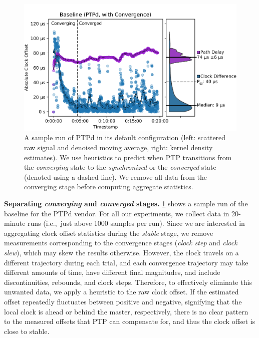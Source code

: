 \begin{figure}
    \includegraphics[width=\linewidth]{res/generated/base/rpi08-convergence_2.pdf}
    \caption{A sample run of PTPd in its default configuration (left: scattered
    raw signal and denoised moving average, right: kernel density estimates).
    We use heuristics to predict when PTP transitions from the
    \textit{converging} state to the \textit{synchronized} or the
    \textit{converged} state (denoted using a dashed line).
    We remove all data from the converging stage before computing aggregate
    statistics.}
    \label{fig:baseline_sample}
\end{figure}

\textbf{Separating \textit{converging} and \textit{converged} stages.}
\cref{fig:baseline_sample} shows a sample run of the baseline for the
PTPd vendor.
For all our experiments, we collect data in 20-minute runs
(i.e.,~just above 1000 samples per run).
Since we are interested in aggregating clock offset statistics during the
\textit{stable} stage,
we remove measurements corresponding to the convergence stages
(\textit{clock step} and \textit{clock slew}),
which may skew the results otherwise.
However, the clock travels on a different trajectory during each trial,
and each convergence trajectory may take different amounts of time, have
different final magnitudes, and include discontinuities, rebounds, and
clock steps.
Therefore, to effectively eliminate this unwanted data,
we apply a heuristic to the raw clock offset.
If the estimated offset repeatedly fluctuates between positive and negative,
signifying that the local clock is ahead or behind the master, respectively,
there is no clear pattern to the measured offsets that PTP can compensate for,
and thus the clock offset is close to stable.

